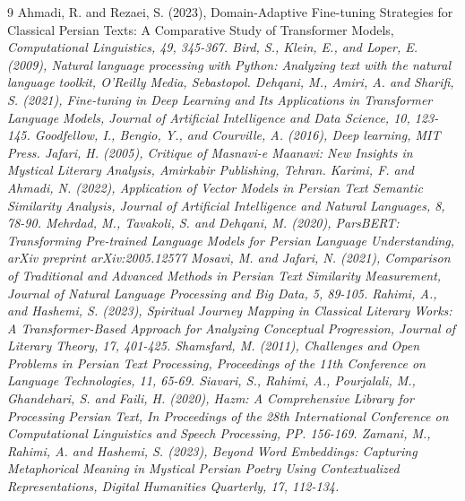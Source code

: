\documentclass[twoside]{article}
\begin{document}
\begin{thebibliography}{9}
Ahmadi, R. and Rezaei,  S. (2023),   Domain-Adaptive Fine-tuning Strategies for Classical Persian Texts: A Comparative Study of Transformer Models, 
\it{Computational Linguistics}, 49, 345-367.
Bird, S., Klein, E.,  and Loper, E. (2009), {\it  Natural language processing with Python: Analyzing text with the natural language toolkit}, O'Reilly Media,  Sebastopol.
Dehqani, M., Amiri,  A.  and  Sharifi, S. (2021), Fine-tuning in Deep Learning and Its Applications in Transformer Language Models,
{\it  Journal of Artificial Intelligence and Data Science}, 10, 123-145.
Goodfellow, I., Bengio, Y.,  and Courville, A. (2016),  {\it  Deep learning}, MIT Press.
Jafari,  H. (2005), {\it Critique of Masnavi-e Maanavi: New Insights in Mystical Literary Analysis}, Amirkabir Publishing,  Tehran. 
Karimi, F.  and  Ahmadi, N. (2022), Application of Vector Models in Persian Text Semantic Similarity Analysis,
{\it Journal of Artificial Intelligence and Natural Languages}, 8, 78-90.
Mehrdad, M., Tavakoli,  S.  and Dehqani, M. (2020), 
ParsBERT: Transforming Pre-trained Language Models for Persian Language Understanding, 
{\it arXiv preprint arXiv:2005.12577}
Mosavi, M.  and  Jafari, N. (2021),  Comparison of Traditional and Advanced Methods in Persian Text Similarity Measurement,
{\it  Journal of Natural Language Processing and Big Data},  5, 89-105.
Rahimi, A., and Hashemi, S. (2023), Spiritual Journey Mapping in Classical Literary Works: A Transformer-Based Approach for Analyzing Conceptual Progression, 
{\it Journal of Literary Theory}, 17, 401-425. 
 Shamsfard, M.  (2011),  Challenges and Open Problems in Persian Text Processing,  {\it  Proceedings of the 11th Conference on Language Technologies}, 11, 65-69.
Siavari, S., Rahimi,  A.,  Pourjalali,  M.,   Ghandehari,  S.  and Faili,  H. (2020),  Hazm: A Comprehensive Library for Processing Persian Text, 
In  {\it  Proceedings of the 28th International Conference on Computational Linguistics and Speech Processing},  PP. 156-169.
Zamani, M., Rahimi,  A. and Hashemi, S. (2023),  Beyond Word Embeddings: Capturing Metaphorical Meaning in Mystical Persian Poetry Using Contextualized Representations,
{\it  Digital Humanities Quarterly}, 17, 112-134. 
\end{thebibliography}
 
\end{document}
